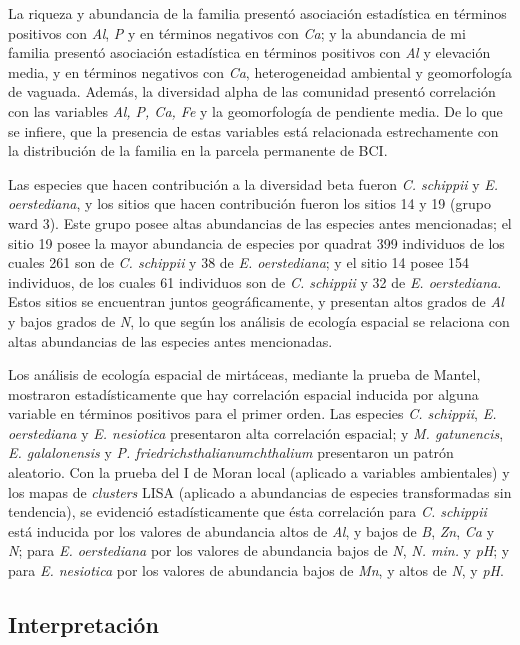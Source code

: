 \documentclass[11pt,]{article}
\begin{document}
La riqueza y abundancia de la familia presentó asociación estadística en
términos positivos con \emph{Al}, \emph{P} y en términos negativos con
\emph{Ca}; y la abundancia de mi familia presentó asociación estadística
en términos positivos con \emph{Al} y elevación media, y en términos
negativos con \emph{Ca}, heterogeneidad ambiental y geomorfología de
vaguada. Además, la diversidad alpha de las comunidad presentó
correlación con las variables \emph{Al, P, Ca, Fe} y la geomorfología de
pendiente media. De lo que se infiere, que la presencia de estas
variables está relacionada estrechamente con la distribución de la
familia en la parcela permanente de BCI.

Las especies que hacen contribución a la diversidad beta fueron \emph{C.
schippii} y \emph{E. oerstediana}, y los sitios que hacen contribución
fueron los sitios 14 y 19 (grupo ward 3). Este grupo posee altas
abundancias de las especies antes mencionadas; el sitio 19 posee la
mayor abundancia de especies por quadrat 399 individuos de los cuales
261 son de \emph{C. schippii} y 38 de \emph{E. oerstediana}; y el sitio
14 posee 154 individuos, de los cuales 61 individuos son de \emph{C.
schippii} y 32 de \emph{E. oerstediana}. Estos sitios se encuentran
juntos geográficamente, y presentan altos grados de \emph{Al} y bajos
grados de \emph{N}, lo que según los análisis de ecología espacial se
relaciona con altas abundancias de las especies antes mencionadas.

Los análisis de ecología espacial de mirtáceas, mediante la prueba de
Mantel, mostraron estadísticamente que hay correlación espacial inducida
por alguna variable en términos positivos para el primer orden. Las
especies \emph{C. schippii}, \emph{E. oerstediana} y \emph{E. nesiotica}
presentaron alta correlación espacial; y \emph{M. gatunencis}, \emph{E.
galalonensis} y \emph{P. friedrichsthalianumchthalium} presentaron un
patrón aleatorio. Con la prueba del I de Moran local (aplicado a
variables ambientales) y los mapas de \emph{clusters} LISA (aplicado a
abundancias de especies transformadas sin tendencia), se evidenció
estadísticamente que ésta correlación para \emph{C. schippii} está
inducida por los valores de abundancia altos de \emph{Al}, y bajos de
\emph{B}, \emph{Zn}, \emph{Ca} y \emph{N}; para \emph{E. oerstediana}
por los valores de abundancia bajos de \emph{N}, \emph{N. min.} y
\emph{pH}; y para \emph{E. nesiotica} por los valores de abundancia
bajos de \emph{Mn}, y altos de \emph{N}, y \emph{pH}.

\subsection{Interpretación}\label{interpretaciuxf3n}
\end{document}
